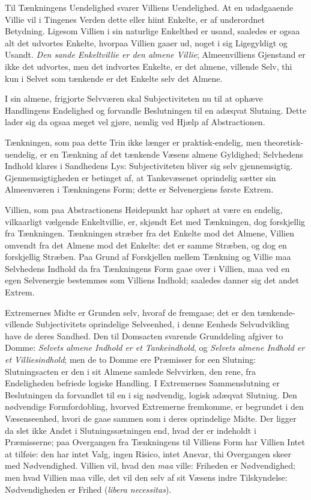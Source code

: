 \documentclass[12pt]{book}
\newcommand{\opage}[1]{\marginnote{\footnotesize\textit{[#1]}}}
\begin{document}
Til Tænkningens Uendelighed svarer Villiens Uendelighed. At en
udadgaaende Villie vil i Tingenes Verden dette eller hiint Enkelte,
er af underordnet Betydning. Ligesom Villien i sin naturlige
Enkelthed er usand, saaledes er ogsaa alt det udvortes Enkelte,
hvorpaa Villien gaaer ud, noget i sig Ligegyldigt og Usandt.
\emph{Den sande Enkeltvillie er den almene Villie}; Almeenvilliens
Gjenstand er ikke det
\opage{55} udvortes, men det indvortes Enkelte, er det almene, villende Selv,
thi kun i Selvet som tænkende er det Enkelte selv det Almene.

I sin almene, frigjorte Selvværen skal Subjectiviteten nu til at
ophæve Handlingens Endelighed og forvandle Beslutningen til en
adæqvat Slutning. Dette lader sig da ogsaa meget vel gjøre, nemlig
ved Hjælp af Abstractionen.

Tænkningen, som paa dette Trin ikke længer er praktisk-endelig, men
theoretisk-uendelig, er en Tænkning af det tænkende Væsens almene
Gyldighed; Selvhedens Indhold klares i Sandhedens Lys:
Subjectiviteten bliver sig selv gjennemsigtig. Gjennemsigtigheden er
betinget af, at Tankevæsenet oprindelig sætter sin Almeenværen i
Tænkningens Form; dette er Selvenergiens første Extrem.

Villien, som paa Abstractionens Høidepunkt har ophørt at være en
endelig, vilkaarligt vælgende Enkeltvillie, er, skjøndt Eet med
Tænkningen, dog forskjellig fra Tænkningen. Tænkningen stræber fra
det Enkelte mod det Almene, Villien omvendt fra det Almene mod det
Enkelte: det er samme Stræben, og dog en forskjellig Stræben. Paa
Grund af Forskjellen mellem Tænkning og Villie maa Selvhedens
Indhold da fra Tænkningens Form gaae over i Villien, maa ved en egen
Selvenergie bestemmes som Villiens Indhold; saaledes danner sig det
andet Extrem.

Extremernes Midte er Grunden selv, hvoraf de fremgaae; det er den
tænkende-villende Subjectivitets oprindelige Selveenhed, i denne
Eenheds Selvudvikling have de deres Sandhed. Den til Domsacten
svarende Grunddeling afgiver to Domme: \emph{Selvets almene Indhold
er et Tankeindhold}, og \emph{Selvets almene Indhold er et
Villiesindhold}; men de to Domme ere Præmisser for een Slutning:
Slutningsacten er den i sit Almene samlede Selvvirken, den rene, fra
Endeligheden befriede logiske Handling.
\opage{56} I Extremernes Sammenslutning er Beslutningen da forvandlet til en i
sig nødvendig, logisk adæqvat Slutniug.
Den nødvendige Formfordobling, hvorved Extremerne fremkomme, er
begrundet i den Væsenseenhed, hvori de gaae sammen som i deres
oprindelige Midte. Der ligger da slet ikke Andet i
Slutningssætningen end, hvad der er indeholdt i Præmisserne; paa
Overgangen fra Tænkningens til Villiens Form har Villien Intet at
tilføie: den har intet Valg, ingen Risico, intet Ansvar, thi
Overgangen skeer med Nødvendighed. Villien vil, hvad den \emph{maa}
ville: Friheden er Nødvendighed; men hvad Villien maa ville, det vil
den selv af sit Væsens indre Tilskyndelse: Nødvendigheden er Frihed
(\textit{libera necessitas}).
\end{document}
